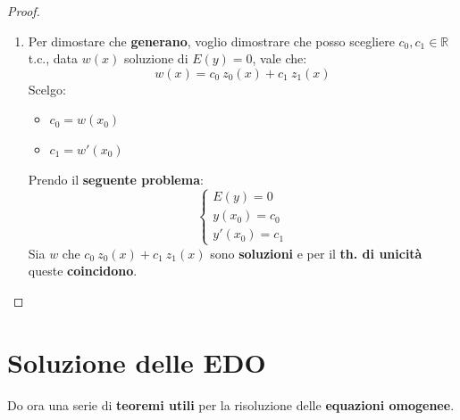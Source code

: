 \documentclass[a4paper, oneside]{article}
\newcommand\R{\mathbb{R}}
\begin{document}
\begin{theorem}
\begin{proof}
\begin{enumerate}
                    \item Per dimostare che \textbf{generano}, voglio dimostrare che posso scegliere $c_0,c_1\in\R$ t.c., data
                    $w(x)$ soluzione di $E(y) = 0$, vale che:
                    \[w(x) = c_0 \ z_0(x) + c_1 \ z_1(x)\]
                    Scelgo:
                    \begin{itemize}
                        \item $c_0 = w(x_0)$
                        \item $c_1 = w'(x_0)$
                    \end{itemize}
                    Prendo il \textbf{seguente problema}:
                    \[\begin{cases}
                        E(y) = 0\\
                        y(x_0) = c_0\\
                        y'(x_0) = c_1
                    \end{cases}\]
                    Sia $w$ che $c_0 \ z_0(x) + c_1 \ z_1(x)$ sono \textbf{soluzioni} e per il \textbf{th. di unicità} queste \textbf{coincidono}.\\
                \end{enumerate}
            \end{proof}
        \end{theorem}

    \newpage

    \section{Soluzione delle EDO}

    Do ora una serie di \textbf{teoremi utili} per la risoluzione delle \textbf{equazioni omogenee}.
\end{document}
